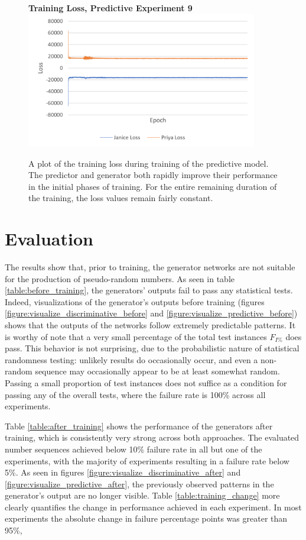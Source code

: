 \documentclass[12pt, titlepage]{report}
\theoremstyle{definition}
\begin{document}
\begin{figure}[H]
    \centering
    \textbf{Training Loss, Predictive Experiment 9}
    \includegraphics[width=0.9\textwidth]{img/pred_loss.png}\\
    \caption[Training loss, predictive experiment 9]{A plot of the training loss during training of the predictive model. The predictor and generator both rapidly improve their performance in the initial phases of training. For the entire remaining duration of the training, the loss values remain fairly constant.}
    \label{figure:loss_predgan}
\end{figure}


\section{Evaluation}\label{subsection:evaluation}
The results show that, prior to training, the generator networks are not suitable for the production of pseudo-random numbers. As seen in table \ref{table:before_training}, the generators' outputs fail to pass any statistical tests. Indeed, visualizations of the generator's outputs before training (figures \ref{figure:visualize_discriminative_before} and \ref{figure:visualize_predictive_before}) shows that the outputs of the networks follow extremely predictable patterns. It is worthy of note that a very small percentage of the total test instances $F_{I\%}$ does pass. This behavior is not surprising, due to the probabilistic nature of statistical randomness testing: unlikely results do occasionally occur, and even a non-random sequence may occasionally appear to be at least somewhat random. Passing a small proportion of test instances does not suffice as a condition for passing any of the overall tests, where the failure rate is 100\% across all experiments. 

Table \ref{table:after_training} shows the performance of the generators after training, which is consistently very strong across both approaches. The evaluated number sequences achieved below 10\% failure rate in all but one of the experiments, with the majority of experiments resulting in a failure rate below 5\%. As seen in figures \ref{figure:visualize_discriminative_after} and \ref{figure:visualize_predictive_after}, the previously observed patterns in the generator's output are no longer visible. Table \ref{table:training_change} more clearly quantifies the change in performance achieved in each experiment. In most experiments the absolute change in failure percentage points was greater than 95\%, 
\end{document}
